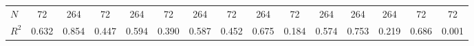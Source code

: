 \begin{table}[htbp]
\begin{tabular}{l*{14}{c}}
\hline
\(N\)       &          72         &         264         &          72         &         264         &          72         &         264         &          72         &         264         &          72         &         264         &         264         &         264         &          72         &          72         \\
\(R^{2}\)   &       0.632         &       0.854         &       0.447         &       0.594         &       0.390         &       0.587         &       0.452         &       0.675         &       0.184         &       0.574         &       0.753         &       0.219         &       0.686         &       0.001         \\
\hline\hline
\end{tabular}
\end{table}
